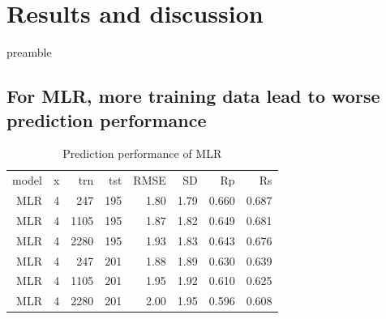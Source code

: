 \documentclass[journal=jacsat,manuscript=article]{achemso}
\begin{document}
\section{Results and discussion}

preamble

\subsection{For MLR, more training data lead to worse prediction performance}

\begin{table}
\caption{Prediction performance of MLR}
\label{tbl:performance}
\begin{tabular}{rrrrrrrr}
\hline
model & x & trn & tst & RMSE & SD & Rp & Rs\\
MLR & 4 &  247 & 195 & 1.80 & 1.79 & 0.660 & 0.687\\
MLR & 4 & 1105 & 195 & 1.87 & 1.82 & 0.649 & 0.681\\
MLR & 4 & 2280 & 195 & 1.93 & 1.83 & 0.643 & 0.676\\
MLR & 4 &  247 & 201 & 1.88 & 1.89 & 0.630 & 0.639\\
MLR & 4 & 1105 & 201 & 1.95 & 1.92 & 0.610 & 0.625\\
MLR & 4 & 2280 & 201 & 2.00 & 1.95 & 0.596 & 0.608\\
\hline
\end{tabular}
\end{table}
\end{document}
